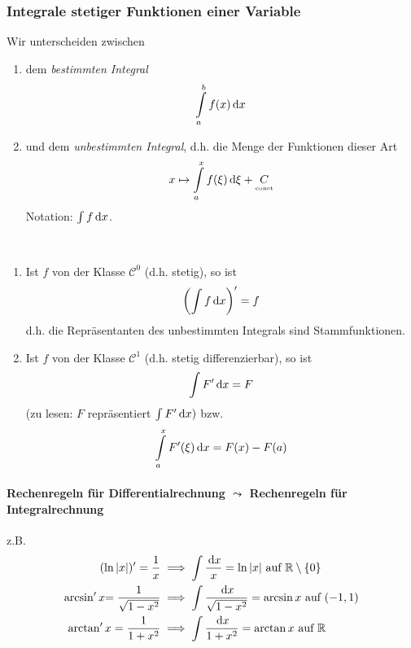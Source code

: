 \newpage
\appendix
\subsubsection*{Integrale stetiger Funktionen einer Variable} %
Wir unterscheiden zwischen
\begin{enumerate}[- ,topsep =-3pt]
	\item dem \emph{bestimmten Integral}
				$$ \int\limits_a^b f(x)\, \mathrm{d} x$$
	\item und dem \emph{unbestimmten Integral}, d.h. die Menge der Funktionen dieser Art
	$$x \mapsto \int\limits_a^x f(\xi) \, \mathrm{d} \xi + \underset{\text{\tiny const}}C$$
	Notation: $\int f \, \mathrm{d} x$.
\end{enumerate}

\begin{satz}  \begin{mdframed} \
\begin{enumerate}[(\roman*), topsep = -1 pt]
	\item Ist $f$ von der Klasse $\mathcal{C}^0$ (d.h. stetig), so ist 
		$$\left(\int f \, \mathrm{d} x\right)' = f$$
		d.h. die Repräsentanten des unbestimmten Integrals sind Stammfunktionen.
	\item Ist $f$ von der Klasse $\mathcal{C}^1$ (d.h. stetig differenzierbar), so ist
	$$ \int F' \, \mathrm{d} x =F$$
	(zu lesen: $F$ repräsentiert $\int F' \, \mathrm{d} x)$ bzw.
	$$ \int\limits_a^x F'(\xi) \, \mathrm{d} x = F(x) -F(a)$$
\end{enumerate}
\end{mdframed}
\end{satz}

\paragraph{Rechenregeln für Differentialrechnung $\leadsto$ Rechenregeln für Integralrechnung}z.B.
\begin{equation*}
	\begin{split}
		(\ln |x|)' = \frac{1}{x} & \implies \int \frac{\, \mathrm{d} x}{x} = \ln |x| \text{ auf } \mathbb{R}\setminus\{0\}\\
		\arcsin' x {=\frac{1}{\sqrt{1-x^2}}} & \implies \int \frac{\, \mathrm{d} x}{\sqrt{1-x^2}} = \arcsin x \text{ auf } (-1,1) \\ 		
		\arctan' x = \frac{1}{1+x^2} & \implies \int \frac{\, \mathrm{d} x}{1+x^2} = \arctan x \text{ auf }\mathbb{R}
	\end{split}
\end{equation*}
